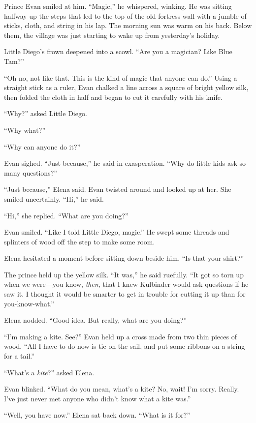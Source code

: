 \documentclass[10pt]{book}
\begin{document}
Prince Evan smiled at him. ``Magic,'' he whispered, winking. He was sitting halfway up the steps that led to the top of the old fortress wall with a jumble of sticks, cloth, and string in his lap. The morning sun was warm on his back. Below them, the village was just starting to wake up from yesterday's holiday.

Little Diego's frown deepened into a scowl. ``Are you a magician?  Like Blue Tam?''

``Oh no, not like that. This is the kind of magic that anyone can do.'' Using a straight stick as a ruler, Evan chalked a line across a square of bright yellow silk, then folded the cloth in half and began to cut it carefully with his knife.

``Why?'' asked Little Diego.

``Why what?''

``Why can anyone do it?''

Evan sighed. ``Just because,'' he said in exasperation. ``Why do little kids ask so many questions?''

``Just because,'' Elena said. Evan twisted around and looked up at her. She smiled uncertainly. ``Hi,'' he said.

``Hi,'' she replied. ``What are you doing?''

Evan smiled. ``Like I told Little Diego, magic.'' He swept some threads and splinters of wood off the step to make some room.

Elena hesitated a moment before sitting down beside him. ``Is that your shirt?''

The prince held up the yellow silk. ``It was,'' he said ruefully. ``It got so torn up when we were---you know, \emph{then}, that I knew Kulbinder would ask questions if he saw it. I thought it would be smarter to get in trouble for cutting it up than for you-know-what.''

Elena nodded. ``Good idea. But really, what are you doing?''

``I'm making a kite. See?'' Evan held up a cross made from two thin pieces of wood. ``All I have to do now is tie on the sail, and put some ribbons on a string for a tail.''

``What's a \emph{kite}?'' asked Elena.

Evan blinked. ``What do you mean, what's a kite?  No, wait! I'm sorry. Really. I've just never met anyone who didn't know what a kite was.''

``Well, you have now.'' Elena sat back down. ``What is it for?''
\end{document}
